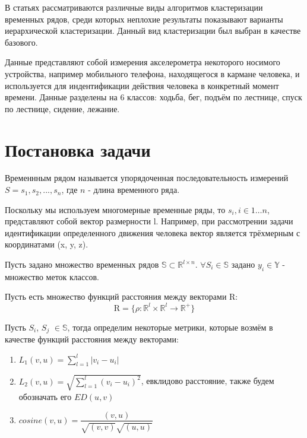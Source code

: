 \documentclass[12pt,twoside]{article}
\begin{document}
        В статьях \cite{WARRENLIAO20051857} \cite{AGHABOZORGI201516} рассматриваются различные виды алгоритмов кластеризации временных рядов,
        среди которых неплохие результаты показывают варианты иерархической кластеризации.
        Данный вид кластеризации был выбран в качестве базового.
        
        Данные \cite{Kwapisz:2011:ARU:1964897.1964918} представляют собой измерения акселерометра некоторого носимого устройства,
        например мобильного телефона, находящегося в кармане человека, и используется для индентификации действия человека в конкретный момент времени.
        Данные разделены на 6 классов: ходьба, бег, подъём по лестнице, спуск по лестнице, сидение, лежание.
                
    \section{Постановка задачи}
		
        Временнным рядом называется упорядоченная последовательность измерений $S = s_1,s_2,...,s_n$,
        где $n$ \-- длина временного ряда.
        
        Поскольку мы используем многомерные временные ряды, то $s_i, i \in 1\dots n$, представляют собой вектор размерности l.
        Например, при рассмотрении задачи идентификации определенного движения человека вектор является трёхмерным с координатами (x, y, z).

        Пусть задано множество временных рядов $\mathbb{S} \subset \mathbb{R}^{l \times n}$.
        $\forall S_i \in \mathbb{S}$ задано ${y_i \in \mathbb{Y}}$ \-- множество меток классов.

        Пусть есть множество функций расстояния между векторами $\mathrm{R}$:
        $$
            \mathrm{R} = \{\rho: \mathbb{R}^l \times \mathbb{R}^l \rightarrow \mathbb{R}^+ \}
        $$
				
        Пусть $S_i$, $S_j$ $\in \mathbb{S}$, тогда определим некоторые метрики, которые возмём в качестве функций расстояния между векторами: 
        
        \begin{enumerate}
            \item $L_1(v, u) = {\displaystyle\sum_{l = 1}^{l} |v_i - u_i|}$
            \item $L_2(v, u) = \sqrt{\displaystyle\sum_{l = 1}^{l} (v_i - u_i)^2}$,
                евклидово расстояние, также будем обозначать его $ED(u, v)$
            \item $cosine(v, u) = \dfrac{(v, u)}{\sqrt{(v, v)}\sqrt{(u, u)}}$
        \end{enumerate}
\end{document}

